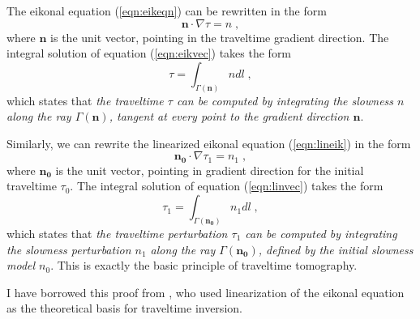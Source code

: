 
The eikonal equation (\ref{eqn:eikeqn}) can be rewritten in the form
\begin{equation}
\mathbf{n}  \cdot \nabla \tau = n \;,
\label{eqn:eikvec}
\end{equation} 
where $\mathbf{n}$ is the unit vector, pointing in the traveltime
gradient direction. The integral solution of equation (\ref{eqn:eikvec})
takes the form
\begin{equation}
\tau = \int_{\Gamma (\mathbf{n})} n dl\;,
\label{eqn:eikint}
\end{equation} 
which states that \emph{the traveltime $\tau$ can be computed by
integrating the slowness $n$ along the ray $\Gamma (\mathbf{n})$,
tangent at every point to the gradient direction $\mathbf{n}$}.
\par
Similarly, we can rewrite the linearized eikonal equation (\ref{eqn:lineik})
in the form
\begin{equation}
\mathbf{n_0}  \cdot \nabla \tau_1 = n_1 \;,
\label{eqn:linvec}
\end{equation}
where $\mathbf{n_0}$ is the unit vector, pointing in gradient
direction for the initial traveltime $\tau_0$.  The integral solution
of equation (\ref{eqn:linvec}) takes the form
\begin{equation}
\tau_1 = \int_{\Gamma (\mathbf{n_0})} n_1 dl\;,
\label{eqn:eikint}
\end{equation} 
which states that \emph{the traveltime perturbation $\tau_1$ can be
  computed by integrating the slowness perturbation $n_1$ along the
  ray $\Gamma (\mathbf{n_0})$, defined by the initial slowness model
  $n_0$}.  This is exactly the basic principle of traveltime
tomography.
\par
I have borrowed this proof from \cite{nsk}, who used linearization
of the eikonal equation as the theoretical basis for traveltime inversion.

